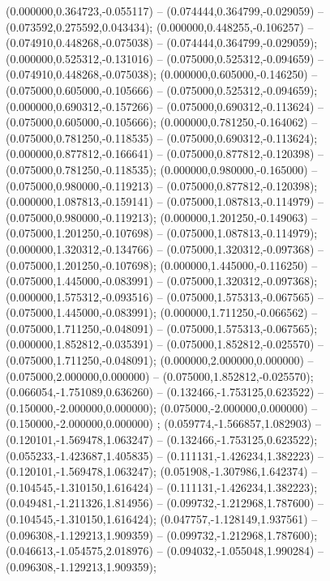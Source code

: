  (0.000000,0.364723,-0.055117) -- (0.074444,0.364799,-0.029059) -- (0.073592,0.275592,0.043434);
 (0.000000,0.448255,-0.106257) -- (0.074910,0.448268,-0.075038) -- (0.074444,0.364799,-0.029059);
 (0.000000,0.525312,-0.131016) -- (0.075000,0.525312,-0.094659) -- (0.074910,0.448268,-0.075038);
 (0.000000,0.605000,-0.146250) -- (0.075000,0.605000,-0.105666) -- (0.075000,0.525312,-0.094659);
 (0.000000,0.690312,-0.157266) -- (0.075000,0.690312,-0.113624) -- (0.075000,0.605000,-0.105666);
 (0.000000,0.781250,-0.164062) -- (0.075000,0.781250,-0.118535) -- (0.075000,0.690312,-0.113624);
 (0.000000,0.877812,-0.166641) -- (0.075000,0.877812,-0.120398) -- (0.075000,0.781250,-0.118535);
 (0.000000,0.980000,-0.165000) -- (0.075000,0.980000,-0.119213) -- (0.075000,0.877812,-0.120398);
 (0.000000,1.087813,-0.159141) -- (0.075000,1.087813,-0.114979) -- (0.075000,0.980000,-0.119213);
 (0.000000,1.201250,-0.149063) -- (0.075000,1.201250,-0.107698) -- (0.075000,1.087813,-0.114979);
 (0.000000,1.320312,-0.134766) -- (0.075000,1.320312,-0.097368) -- (0.075000,1.201250,-0.107698);
 (0.000000,1.445000,-0.116250) -- (0.075000,1.445000,-0.083991) -- (0.075000,1.320312,-0.097368);
 (0.000000,1.575312,-0.093516) -- (0.075000,1.575313,-0.067565) -- (0.075000,1.445000,-0.083991);
 (0.000000,1.711250,-0.066562) -- (0.075000,1.711250,-0.048091) -- (0.075000,1.575313,-0.067565);
 (0.000000,1.852812,-0.035391) -- (0.075000,1.852812,-0.025570) -- (0.075000,1.711250,-0.048091);
 (0.000000,2.000000,0.000000) -- (0.075000,2.000000,0.000000) -- (0.075000,1.852812,-0.025570);
 (0.066054,-1.751089,0.636260) -- (0.132466,-1.753125,0.623522) -- (0.150000,-2.000000,0.000000);
 (0.075000,-2.000000,0.000000) -- (0.150000,-2.000000,0.000000) ;
 (0.059774,-1.566857,1.082903) -- (0.120101,-1.569478,1.063247) -- (0.132466,-1.753125,0.623522);
 (0.055233,-1.423687,1.405835) -- (0.111131,-1.426234,1.382223) -- (0.120101,-1.569478,1.063247);
 (0.051908,-1.307986,1.642374) -- (0.104545,-1.310150,1.616424) -- (0.111131,-1.426234,1.382223);
 (0.049481,-1.211326,1.814956) -- (0.099732,-1.212968,1.787600) -- (0.104545,-1.310150,1.616424);
 (0.047757,-1.128149,1.937561) -- (0.096308,-1.129213,1.909359) -- (0.099732,-1.212968,1.787600);
 (0.046613,-1.054575,2.018976) -- (0.094032,-1.055048,1.990284) -- (0.096308,-1.129213,1.909359);
